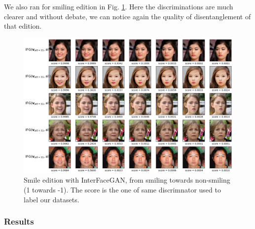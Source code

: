 \documentclass[a4paper]{article}
\begin{document}
We also ran for smiling edition in Fig. \ref{ifganexp2}. Here the discriminations are much clearer and without debate, we can notice again the quality of disentanglement of that edition.

\begin{figure}[hbt!]
    \centering
    \includegraphics[width=\hsize]{fig/IFGANSmileTounsmile.png}
    \caption{Smile edition with InterFaceGAN, from smiling towards non-smiling (1 towards -1). The score is the one of same discrimnator used to label our datasets.}
    \label{ifganexp2}
\end{figure}
\subsubsection*{Results}
\end{document}
